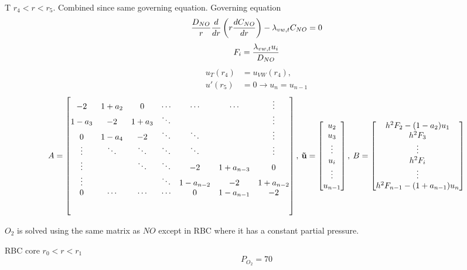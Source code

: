 \documentclass[8pt, a4paper]{article}
\begin{document}
  T $r_4<r<r_5$. Combined since same governing equation.
  Governing equation
  \begin{equation*}
  \frac{D_{NO}}{r}\frac{d}{dr}\left(r\frac{dC_{NO}}{dr}\right)-\lambda_{vw,t}C_{NO}=0
  \end{equation*}
  \begin{equation*}
  F_i=\frac{\lambda_{vw,t}u_i}{D_{NO}}
  \end{equation*}
  \begin{align*}
  u_{T}(r_4)&=u_{VW}(r_4),\\    
  u'(r_5)&=0\rightarrow u_n=u_{n-1}
  \end{align*}
  \begin{equation}
  A=
  \begin{bmatrix}
  -2 & 1+a_2 & 0 & \cdots & \cdots & \cdots & \vdots \\
  1-a_3 & -2 & 1+a_3 & \ddots & & & \vdots \\
  0 & 1-a_4 & -2 & \ddots & \ddots & & \vdots \\
  \vdots & \ddots & \ddots & \ddots & \ddots & & \vdots \\
  \vdots & & \ddots & \ddots & -2 & 1+a_{n-3} & 0 \\
  \vdots & & & \ddots & 1-a_{n-2} & -2 & 1+a_{n-2} \\
  0 & \cdots & \cdots & \cdots & 0 & 1-a_{n-1} & -2 \\[5ex]
  \end{bmatrix},\:
  \mathbf{\vec{u}}=
  \begin{bmatrix}
  u_2\\
  u_3\\
  \vdots\\
  u_i\\
  \vdots\\
  u_{n-1}
  \end{bmatrix},\:
  B=
  \begin{bmatrix}
  h^2F_2-(1-a_2)u_1\\
  h^2F_3\\
  \vdots\\
  h^2F_i\\
  \vdots\\
  h^2F_{n-1}-(1+a_{n-1})u_n
  \end{bmatrix}
  \end{equation}
  
  $O_2$ is solved using the same matrix as $NO$ except in RBC where it has a 
  constant partial pressure.
  
  RBC core $r_0 < r < r_1$
  \begin{equation*}
  P_{O_2}=70
  \end{equation*}
  
\end{document}
